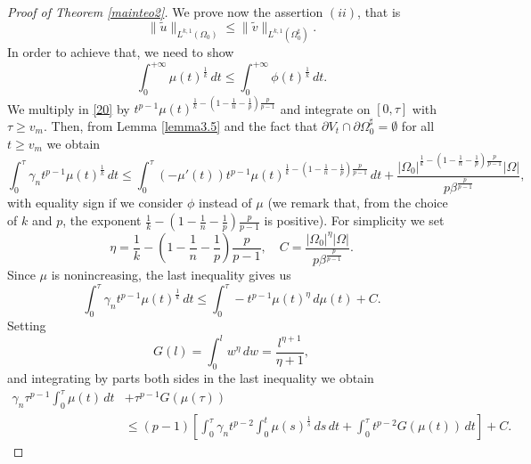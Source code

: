 \documentclass[12pt]{article}
\newcommand{\abs}[1]{{\left|#1\right|}}
\theoremstyle{definition}
\theoremstyle{plain}
\theoremstyle{definition}
\begin{document}
\begin{proof}[Proof of Theorem \ref{mainteo2}]
   We prove now the assertion $(ii)$, that is
    \begin{equation*}
        \|\tilde u\|_{L^{k,1}(\Omega_0)}\leq \|\tilde v\|_{L^{k,1}(\Omega^\sharp_0)}.
    \end{equation*}
    In order to achieve that, we need to show 
    \begin{equation*}
        \int_0^{+\infty}\mu(t)^\frac{1}{k}\,dt\leq\int_0^{+\infty}\phi(t)^\frac{1}{k}\,dt.
    \end{equation*}
    We multiply in \eqref{20} by $t^{p-1}\mu(t)^{\frac{1}{k}-\left(1-\frac{1}{n}-\frac{1}{p} \right)\frac{p}{p-1}}$ and integrate on $[0,\tau]$ with $\tau\geq v_m$. Then, from Lemma \ref{lemma3.5} and the fact that $\partial V_t\cap \partial\Omega_0^\sharp=\emptyset$ for all $t\geq v_m$ we obtain
    \begin{equation*}
        \int_0^\tau \gamma_nt^{p-1}\mu(t)^\frac{1}{k}\,dt\leq \int_0^\tau (-\mu'(t))t^{p-1}\mu(t)^{\frac{1}{k}-\left(1-\frac{1}{n}-\frac{1}{p} \right)\frac{p}{p-1}}\,dt+\frac{\abs{\Omega_0}^{\frac{1}{k}-\left(1-\frac{1}{n}-\frac{1}{p} \right)\frac{p}{p-1}}\abs{\Omega}}{p\beta^\frac{p}{p-1}},
    \end{equation*}
    with equality sign if we consider $\phi$ instead of $\mu$ (we remark that, from the choice of $k$ and $p$, the exponent $\frac{1}{k}-(1-\frac{1}{n}-\frac{1}{p})\frac{p}{p-1}$ is positive). For simplicity we set
    \begin{equation*}
        \eta={\frac{1}{k}-\left(1-\frac{1}{n}-\frac{1}{p} \right)\frac{p}{p-1}},\quad C=\frac{\abs{\Omega_0}^\eta\abs{\Omega}}{p\beta^\frac{p}{p-1}}.
    \end{equation*}
    Since $\mu$ is nonincreasing, the last inequality gives us
    \begin{equation}\label{24}
        \int_0^\tau \gamma_n t^{p-1}\mu(t)^\frac{1}{k}\,dt\leq\int_0^\tau -t^{p-1}\mu(t)^\eta\,d\mu(t)+C.
    \end{equation}
    Setting
    \begin{equation*}
        G(l)=\int_0^l w^\eta\,dw=\frac{l^{\eta+1}}{\eta+1},
    \end{equation*}
    and integrating by parts both sides in the last inequality we obtain 
    \begin{equation*}
    \begin{split}
        \gamma_n\tau^{p-1}\int_0^\tau \mu(t)\,dt&+\tau^{p-1}G(\mu(\tau))\\
        &\leq(p-1)\left[\int_0^\tau\gamma_nt^{p-2}\int_0^t\mu(s)^\frac{1}{s}\,ds\,dt+\int_0^\tau t^{p-2}G(\mu(t))\,dt \right]+C.

\end{split}
\end{equation*}
\end{proof}
\end{document}
